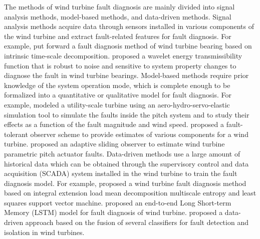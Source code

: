\documentclass[lettersize,journal]{IEEEtran}
\begin{document}

The methods of wind turbine fault diagnosis are mainly divided into signal analysis methods, model-based methods, and data-driven methods\cite{helbing2018deep,li2021wind,habibi2019reliability}.
Signal analysis methods acquire data through sensors installed in various components of the wind turbine and extract fault-related features for fault diagnosis\cite{wang2019vibration,liu2020review,salameh2018gearbox}.  For example, \citet{an2012application} put forward a fault diagnosis method of wind turbine bearing based on intrinsic time-scale decomposition. \citet{zhang2018wavelet} proposed a wavelet energy transmissibility function that is robust to noise and sensitive to system property changes to diagnose the fault in wind turbine bearings. Model-based methods require prior knowledge of the system operation mode, which is complete enough to be formalized into a quantitative or qualitative model for fault diagnosis\cite{abichou2014fault}. For example, \citet{Chaaban2014} modeled a utility-scale turbine using an aero-hydro-servo-elastic simulation tool to simulate the faults inside the pitch system and to study their effects as a function of the fault magnitude and wind speed. \citet{odgaard2012model} proposed a fault-tolerant observer scheme to provide estimates of various components for a wind turbine. \citet{lan2018fault} proposed an adaptive sliding observer to estimate wind turbine parametric pitch actuator faults. Data-driven methods use a large amount of historical data which can be obtained through the supervisory control and data acquisition (SCADA) system installed in the wind turbine to train the fault diagnosis model. For example, \citet{gao2018novel} proposed a wind turbine fault diagnosis method based on integral extension load mean decomposition multiscale entropy and least squares support vector machine.  \citet{lei2019fault} proposed an end-to-end Long Short-term Memory (LSTM) model for fault diagnosis of wind turbine. \citet{pashazadeh2018data} proposed a data-driven approach based on the fusion of several classifiers for fault detection and isolation in wind turbines.

\end{document}
